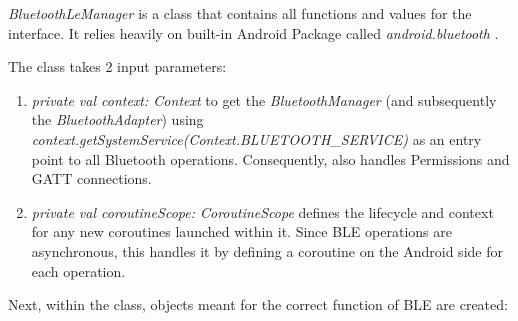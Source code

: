  \textit{BluetoothLeManager} is a class that contains all functions and values for the interface. It relies heavily on built-in Android Package called \textit{android.bluetooth} \cite{android_bluetooth}. 

The class takes 2 input parameters:
\begin{enumerate}
	\item \textit{private val context: Context} to get the \textit{BluetoothManager} (and subsequently the \textit{BluetoothAdapter}) using \textit{context.getSystemService(Context.BLUETOOTH\_SERVICE)} as an entry point to all Bluetooth operations. Consequently, also handles Permissions and \ac{GATT} connections.
	\item \textit{private val coroutineScope: CoroutineScope} defines the lifecycle and context for any new coroutines launched within it. Since \ac{BLE} operations are asynchronous, this handles it by defining a coroutine on the Android side for each operation.
\end{enumerate} 
Next, within the class, objects meant for the correct function of \ac{BLE} are created:
